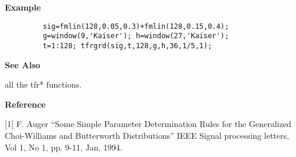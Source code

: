 {\bf \large {}\selectfont Example}
\begin{verbatim}
         sig=fmlin(128,0.05,0.3)+fmlin(128,0.15,0.4);  
         g=window(9,'Kaiser'); h=window(27,'Kaiser'); 
         t=1:128; tfrgrd(sig,t,128,g,h,36,1/5,1);
\end{verbatim}
\vspace*{.5cm}

{\bf \large {}\selectfont See Also}\\
\hspace*{1.5cm}
\begin{minipage}[t]{13.5cm}
all the {\ty tfr*} functions.
\end{minipage}
\vspace*{.5cm}


{\bf \large {}\selectfont Reference}\\
\hspace*{1.5cm}
\begin{minipage}[t]{13.5cm}
[1] F. Auger ``Some Simple Parameter Determination Rules for the
Generalized Choi-Williams and Butterworth Distributions'' IEEE Signal
processing letters, Vol 1, No 1, pp. 9-11, Jan. 1994.

\end{minipage}
